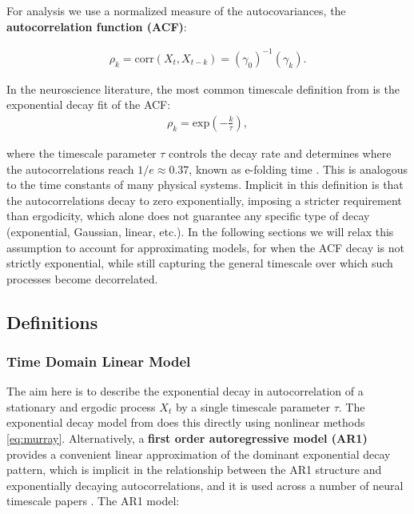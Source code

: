 \documentclass[main.tex]{subfiles}
\begin{document}
For analysis we use a normalized measure of the autocovariances, the \textbf{autocorrelation function (ACF)}:

\begin{align} \label{eq:ACF}
\rho_k = \text{corr}(X_t, X_{t-k}) = (\gamma_0)^{-1}(\gamma_k).
\end{align}

In the neuroscience literature, the most common timescale definition from \citet{murray_hierarchy_2014} is the exponential decay fit of the ACF:
\begin{align} \label{eq:murray}
    \rho_k = \text{exp}(-\frac{k}{\tau}),
\end{align}

\noindent where the timescale parameter $\tau$ controls the decay rate and determines where the autocorrelations reach $1/e \approx 0.37$, known as e-folding time \citep{murray_hierarchy_2014}. This is analogous to the time constants of many physical systems. Implicit in this definition is that the autocorrelations decay to zero exponentially, imposing a stricter requirement than ergodicity, which alone does not guarantee any specific type of decay (exponential, Gaussian, linear, etc.). In the following sections we will relax this assumption to account for approximating models, for when the ACF decay is not strictly exponential, while still capturing the general timescale over which such processes become decorrelated. \\


\subsection{Definitions}
\subsubsection{Time Domain Linear Model}\label{sec:time-domain-linear-model}
The aim here is to describe the exponential decay in autocorrelation of a stationary and ergodic process $X_t$ by a single timescale parameter $\tau$. The exponential decay model from \citet{murray_hierarchy_2014} does this directly using nonlinear methods \ref{eq:murray}. Alternatively, a \textbf{first order autoregressive model (AR1)} provides a convenient linear approximation of the dominant exponential decay pattern, which is implicit in the relationship between the AR1 structure and exponentially decaying autocorrelations, and it is used across a number of neural timescale papers \citep{kaneoke_variance_2012, meisel_decline_2017, huang_timescales_2018, lurie_cortical_2024, shinn_functional_2023, shafiei_topographic_2020}. The AR1 model:
\end{document}
